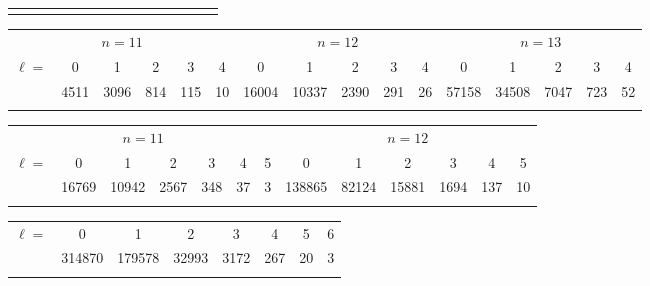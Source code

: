 \documentclass[a4paper,11pt]{article}
\begin{document}
\begin{table}
{\begin{tabular}{r|c|c|c|c|c|c|c|c|c|c|c|c|c|c}
\noalign{\smallskip}\hline
\end{tabular}
\begin{tabular}{r|c|c|c|c|c|c|c|c|c|c|c|c|c|c|c}
\hline\noalign{\smallskip}
\multicolumn{16}{c}{$q=3$, $k=4$}\\
\hline
\multicolumn{6}{c|}{$n=11$}& \multicolumn{5}{c|}{$n=12$}& \multicolumn{5}{c}{$n=13$}\\
\hline
$\ell=$    &  0 &  1& 2& 3& 4&0& 1& 2& 3& 4&0& 1& 2& 3& 4\\
\hline
 &	4511&	3096&	814&	115&	10&	16004&10337&2390&291&26&	57158&	34508&	7047& 723&	52\\
\noalign{\smallskip}\hline
\end{tabular}
\begin{tabular}{r|c|c|c|c|c|c|c|c|c|c|c|c}
\hline\noalign{\smallskip}
\multicolumn{13}{c}{$q=3$, $k=5$}\\
\hline
\multicolumn{7}{c|}{$n=11$}& \multicolumn{6}{c}{$n=12$}\\
\hline
$\ell=$    &  0 &  1& 2& 3& 4&5&0& 1& 2& 3& 4&5\\
\hline
 &	16769&	10942&	2567&	348&	37&	3&138865&82124&15881&1694&	137&	10\\
\noalign{\smallskip}\hline
\end{tabular}
\begin{tabular}{r|c|c|c|c|c|c|c}
\hline\noalign{\smallskip}
\multicolumn{8}{c}{$q=3$, $k=6$, $n=12$}\\
\hline
$\ell=$    &0& 1& 2& 3& 4&5&6\\
\hline
 &	314870&	179578&	32993&	3172&	267&	20&	3\\
\noalign{\smallskip}\hline
\end{tabular}
}
\end{table}
\end{document}
